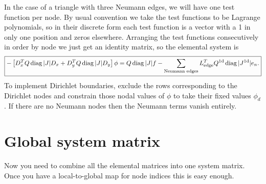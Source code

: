 In the case of a triangle with three Neumann edges, we will have one test function per node.  By usual convention we take the test functions to be Lagrange polynomials, so in their discrete form each test function is a vector with a 1 in only one position and zeros elsewhere.  Arranging the test functions consecutively in order by node we just get an identity matrix, so the elemental system is
%
\begin{equation}
\boxed{
- \left[ D_x^T Q \operatorname{diag} |J| D_x + D_y^T Q  \operatorname{diag} |J| D_y \right] \phi = Q \operatorname{diag} |J| f - \sum_\textrm{Neumann edges} L_\textrm{edge}^T Q^\textrm{1d} \operatorname{diag} | J^\textrm{1d}| e_n.
}
\end{equation}
%
To implement Dirichlet boundaries, exclude the rows corresponding to the Dirichlet nodes and constrain those nodal values of $\phi$ to take their fixed values $\phi_d$.  If there are no Neumann nodes then the Neumann terms vanish entirely.

\section{Global system matrix}

Now you need to combine all the elemental matrices into one system matrix.  Once you have a local-to-global map for node indices this is easy enough.






